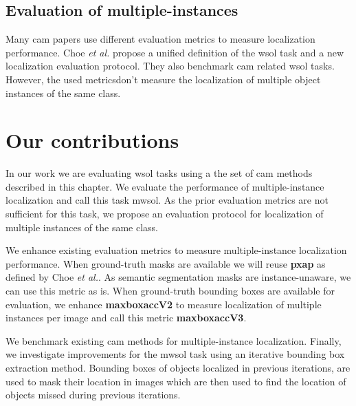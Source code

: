 \subsection{Evaluation of multiple-instances}
Many \acrshort{cam} papers use different evaluation metrics to measure localization performance. Choe \textit{et al.} \cite{choe2020evaluating} propose a unified definition of the \acrshort{wsol} task and a new localization evaluation protocol. They also benchmark \acrshort{cam} related \acrshort{wsol} tasks. However, the used metricsdon't measure the localization of multiple object instances of the same class.

\section{Our contributions}
In our work we are evaluating \acrshort{wsol} tasks using a the set of \acrshort{cam} methods described in this chapter. We evaluate the performance of multiple-instance localization and call this task \acrfull{mwsol}. As the prior evaluation metrics are not sufficient for this task, we propose an evaluation protocol for localization of multiple instances of the same class. 

We enhance existing evaluation metrics \cite{choe2020evaluating} to measure multiple-instance localization performance. When ground-truth masks are available we will reuse \textbf{\acrshort{pxap}} as defined by Choe \textit{et al.}. As semantic segmentation masks are instance-unaware, we can use this metric as is. When ground-truth bounding boxes are available for evaluation, we enhance \textbf{\acrshort{maxboxacc}V2} to measure localization of multiple instances per image and call this metric \textbf{\acrshort{maxboxacc}V3}. 

We benchmark existing \acrshort{cam} methods for multiple-instance localization. Finally, we investigate improvements for the \acrshort{mwsol} task using an iterative bounding box extraction method. Bounding boxes of objects localized in previous iterations, are used to mask their location in images which are then used to find the location of objects missed during previous iterations.